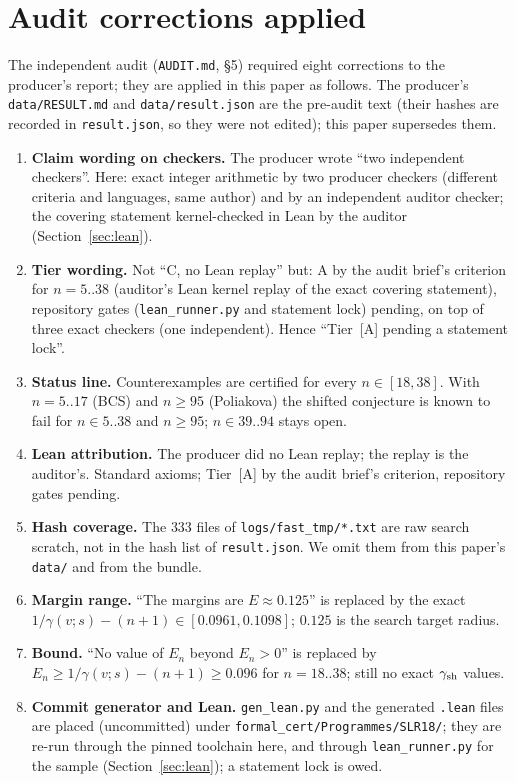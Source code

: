 \documentclass[10pt]{article}
\newcommand{\tier}[1]{\textsf{[#1]}}
\newcommand{\tA}{\tier{A}}
\begin{document}
\section{Audit corrections applied}\label{sec:corr}
The independent audit (\texttt{AUDIT.md}, \S5) required eight corrections to the producer's report; they are applied in this paper as follows. The producer's \texttt{data/RESULT.md} and \texttt{data/result.json} are the pre-audit text (their hashes are recorded in \texttt{result.json}, so they were not edited); this paper supersedes them.
\begin{enumerate}\itemsep=1pt
\item \textbf{Claim wording on checkers.} The producer wrote ``two independent checkers''. Here: exact integer arithmetic by two producer checkers (different criteria and languages, same author) and by an independent auditor checker; the covering statement kernel-checked in Lean by the auditor (Section~\ref{sec:lean}).
\item \textbf{Tier wording.} Not ``C, no Lean replay'' but: A by the audit brief's criterion for $n=5..38$ (auditor's Lean kernel replay of the exact covering statement), repository gates (\texttt{lean\_runner.py} and statement lock) pending, on top of three exact checkers (one independent). Hence ``Tier~\tA{} pending a statement lock''.
\item \textbf{Status line.} Counterexamples are certified for every $n\in[18,38]$. With $n=5..17$ (BCS) and $n\ge95$ (Poliakova) the shifted conjecture is known to fail for $n\in5..38$ and $n\ge95$; $n\in39..94$ stays open.
\item \textbf{Lean attribution.} The producer did no Lean replay; the replay is the auditor's. Standard axioms; Tier~\tA{} by the audit brief's criterion, repository gates pending.
\item \textbf{Hash coverage.} The $333$ files of \texttt{logs/fast\_tmp/*.txt} are raw search scratch, not in the hash list of \texttt{result.json}. We omit them from this paper's \texttt{data/} and from the bundle.
\item \textbf{Margin range.} ``The margins are $E\approx0.125$'' is replaced by the exact $1/\gamma(v;s)-(n+1)\in[0.0961,0.1098]$; $0.125$ is the search target radius.
\item \textbf{Bound.} ``No value of $E_n$ beyond $E_n>0$'' is replaced by $E_n\ge1/\gamma(v;s)-(n+1)\ge0.096$ for $n=18..38$; still no exact $\gamma_{\rm sh}$ values.
\item \textbf{Commit generator and Lean.} \texttt{gen\_lean.py} and the generated \texttt{.lean} files are placed (uncommitted) under \texttt{formal\_cert/Programmes/SLR18/}; they are re-run through the pinned toolchain here, and through \texttt{lean\_runner.py} for the sample (Section~\ref{sec:lean}); a statement lock is owed.
\end{enumerate}
\end{document}
